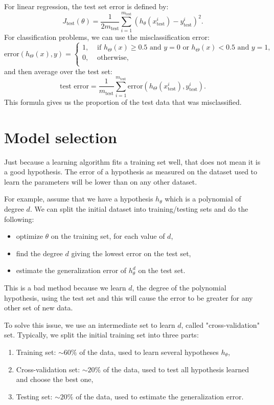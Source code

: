 \documentclass[a4paper,11pt]{report}
\begin{document}
For linear regression, the test set error is defined by: $$J_{\mathrm{test}}(\theta) = \dfrac{1}{2m_{\mathrm{test}}}\sum_{i=1}^{m_{\mathrm{test}}}{(h_\theta(x^i_{\mathrm{test}})−y^i_{\mathrm{test}})^2}.$$
For classification problems, we can use the misclassification error:
$$\mathrm{error}(h_\Theta(x),y) =
\left\{\begin{matrix}
1, & \text{ if }  h_\Theta(x) \geq 0.5 \text{ and } y = 0 \text { or } h_\Theta(x) < 0.5  \text{ and } y = 1, \\
0, & \text{ otherwise,}\\
\end{matrix}\right.$$
and then average over the test set:
$$ \text{test error} = \dfrac{1}{m_{\mathrm{test}}} \sum^{m_{\mathrm{test}}}_{i=1} \mathrm{error}(h_\Theta(x^{i}_{\mathrm{test}}), y^{i}_{\mathrm{test}}).$$
This formula gives us the proportion of the test data that was misclassified.

\section{Model selection}

Just because a learning algorithm fits a training set well, that does not mean it is a good hypothesis. The error of a hypothesis as measured on the dataset used to learn the parameters will be lower than on any other dataset.

For example, assume that we have a hypothesis $h_\theta$ which is a polynomial of degree $d$. We can split the initial dataset into training/testing sets and do the following:
\begin{itemize}
  \item optimize $\theta$ on the training set, for each value of $d$,
  \item find the degree $d$ giving the lowest error on the test set,
  \item estimate the generalization error of $h^d_{\theta}$ on the test set.
\end{itemize}
This is a bad method because we learn $d$, the degree of the polynomial hypothesis, using the test set and this will cause the error to be greater for any other set of new data.

To solve this issue, we use an intermediate set to learn $d$, called "cross-validation" set. Typically, we split the initial training set into three parts:
\begin{enumerate}
  \item Training set: $\sim 60\%$ of the data, used to learn several hypotheses $h_\theta$,
  \item Cross-validation set: $\sim 20\%$ of the data, used to test all hypothesis learned and choose the best one,
  \item Testing set: $\sim 20\%$ of the data, used to estimate the generalization error.
\end{enumerate}
\end{document}
